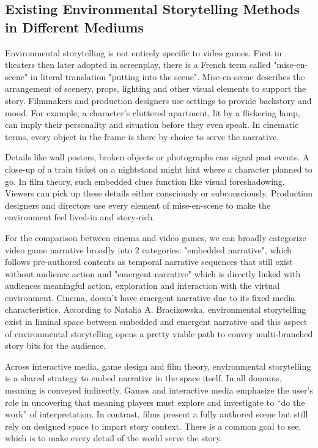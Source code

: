         \subsection{Existing Environmental Storytelling Methods in Different Mediums}
            Environmental storytelling is not entirely specific to video games. First in theaters then later adopted in screenplay, there is a French term called "mise-en-scene" in literal translation "putting into the scene". Mise-en-scene describes the arrangement of scenery, props, lighting and other visual elements to support the story. Filmmakers and production designers use settings to provide backstory and mood. For example, a character’s cluttered apartment, lit by a flickering lamp, can imply their personality and situation before they even speak. In cinematic terms, every object in the frame is there by choice to serve the narrative.\cite{Mise_en_scene}\par
        
            Details like wall posters, broken objects or photographs can signal past events. A close-up of a train ticket on a nightstand might hint where a character planned to go. In film theory, such embedded clues function like visual foreshadowing. Viewers can pick up these details either consciously or subconsciously. Production designers and directors use every element of mise-en-scene to make the environment feel lived-in and story-rich.\par
            
            For the comparison between cinema and video games, we can broadly categorize video game narrative broadly into 2 categories: "embedded narrative", which follows pre-authored contents as temporal narrative sequences that still exist without audience action and "emergent narrative" which is directly linked with audiences meaningful action, exploration and interaction with the virtual environment\cite{Liminal_Space_Between_Embedded_and_Emergent_Narrative}. Cinema, doesn't have emergent narrative due to its fixed media characteristics. According to Natalia A. Bracikowska, environmental storytelling exist in liminal space between embedded and emergent narrative\cite{Liminal_Space_Between_Embedded_and_Emergent_Narrative} and this aspect of environmental storytelling opens a pretty viable path to convey multi-branched story bits for the audience.\par
            
            Across interactive media, game design and film theory, environmental storytelling is a shared strategy to embed narrative in the space itself. In all domains, meaning is conveyed indirectly. Games and interactive media emphasize the user’s role in uncovering that meaning players must explore and investigate to “do the work” of interpretation. In contrast, films present a fully authored scene but still rely on designed space to impart story context. There is a common goal to see, which is to make every detail of the world serve the story.\par
